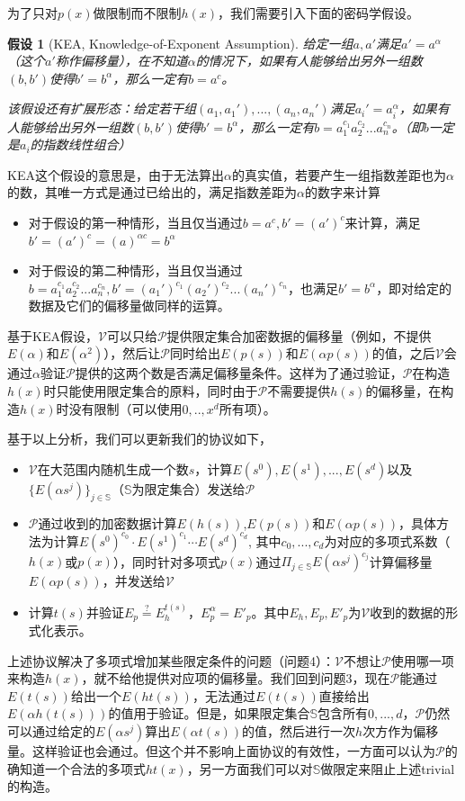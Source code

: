\documentclass[12pt]{article}
\newcommand{\pp}{$\mathcal{P}$}
\newcommand{\vv}{$\mathcal{V}$}
\newtheorem{assumption}{假设}
\begin{document}
为了只对$p(x)$做限制而不限制$h(x)$，我们需要引入下面的密码学假设。
\begin{assumption}[KEA, Knowledge-of-Exponent Assumption]
	给定一组$a,a'$满足$a'= a^\alpha$（这个$a'$称作偏移量），在不知道$\alpha$的情况下，如果有人能够给出另外一组数$(b,b')$使得$b'= b^\alpha$，那么一定有$b=a^c$。
	
	该假设还有扩展形态：给定若干组$(a_1,a_1'),...,(a_n,a_n')$满足$a_i'=a_i^\alpha$，如果有人能够给出另外一组数$(b,b')$使得$b'= b^\alpha$，那么一定有$b=a_1^{c_1}a_2^{c_2}...a_n^{c_n}$。（即$b$一定是$a_i$的指数线性组合）
\end{assumption}
KEA这个假设的意思是，由于无法算出$\alpha$的真实值，若要产生一组指数差距也为$\alpha$的数，其唯一方式是通过已给出的，满足指数差距为$\alpha$的数字来计算
\begin{itemize}
	\item 对于假设的第一种情形，当且仅当通过$b=a^c,b'=(a')^c$来计算，满足$b'= (a')^c=(a)^{\alpha c} = b^\alpha$
	\item 对于假设的第二种情形，当且仅当通过$b=a_1^{c_1}a_2^{c_2}...a_n^{c_n},b'=(a_1')^{c_1}(a_2')^{c_2}...(a_n')^{c_n}$，也满足$b'=b^\alpha$，即对给定的数据及它们的偏移量做同样的运算。
\end{itemize}
基于KEA假设，\vv 可以只给\pp 提供限定集合加密数据的偏移量（例如，不提供$E(\alpha)$和$E(\alpha ^2)$），然后让\pp 同时给出$E(p(s))$和$E(\alpha p(s))$的值，之后\vv 会通过$\alpha$验证\pp 提供的这两个数是否满足偏移量条件。这样为了通过验证，\pp 在构造$h(x)$时只能使用限定集合的原料，同时由于\pp 不需要提供$h(s)$的偏移量，在构造$h(x)$时没有限制（可以使用$0,..,x^d$所有项）。

基于以上分析，我们可以更新我们的协议如下，
\begin{itemize}
	\item \vv 在大范围内随机生成一个数$s$，计算$E(s^0),E(s^1),...,E(s^d)$以及$\{E(\alpha s^j)\}_{j\in \mathbb{S}}$（$\mathbb{S}$为限定集合）发送给\pp
	\item \pp 通过收到的加密数据计算$E(h(s))$,$E(p(s))$和$E(\alpha p(s))$，具体方法为计算$E(s^0)^{c_0}\cdot E(s^1)^{c_1}\cdots E(s^d)^{c_d}$, 其中$c_0,...,c_d$为对应的多项式系数（$h(x)$或$p(x)$），同时针对多项式$p(x)$通过$\Pi_{j \in \mathbb{S}} E(\alpha s^j)^{c_j}$计算偏移量$E(\alpha p(s))$，并发送给\vv
	\item 计算$t(s)$并验证$E_p \overset{?}{=}E_h^{t(s)}$，$E_p^\alpha = E'_p$。其中$E_h,E_p,E'_p$为\vv 收到的数据的形式化表示。
\end{itemize}
上述协议解决了多项式增加某些限定条件的问题（问题4）：\vv 不想让\pp 使用哪一项来构造$h(x)$，就不给他提供对应项的偏移量。我们回到问题3，现在\pp 能通过$E(t(s))$给出一个$E(ht(s))$，无法通过$E(t(s))$直接给出$E(\alpha h(t(s)))$的值用于验证。但是，如果限定集合$\mathbb{S}$包含所有$0,...,d$，\pp 仍然可以通过给定的$E(\alpha s^j)$算出$E(\alpha t(s))$的值，然后进行一次$h$次方作为偏移量。这样验证也会通过。但这个并不影响上面协议的有效性，一方面可以认为\pp 的确知道一个合法的多项式$ht(x)$，另一方面我们可以对$\mathbb{S}$做限定来阻止上述trivial的构造。
\end{document}
